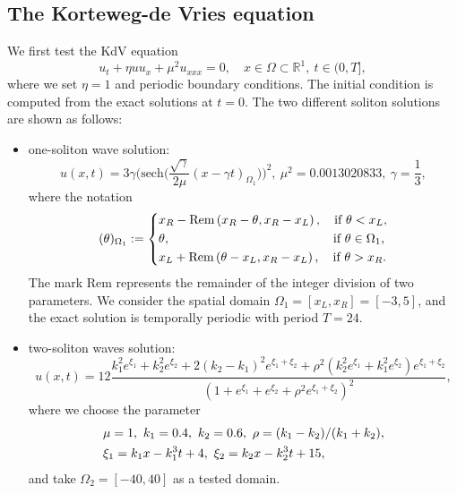 \documentclass[onefignum,onetabnum]{siamart}
\begin{document}
\subsection{The Korteweg-de Vries equation}
We first test the KdV equation
\begin{equation*}
	u_t+\eta uu_x+\mu^2 u_{xxx}=0,\quad x\in\Omega\subset\mathbb{R}^1,~t\in (0,T],
\end{equation*}
where we set $\eta=1$ and periodic boundary conditions. The initial condition is computed from the exact solutions at $t=0$. The two different soliton solutions \cite{luigi-19-HBVM-KDV-JCAM} are shown as follows:
\begin{itemize}
\item[{(1)}]one-soliton wave solution: 
\begin{equation*}
	u(x,t)=3\gamma\Big(\mbox{sech}\big(\frac{\sqrt{\gamma}}{2\mu}(x-\gamma t)_{\Omega_1}\big)\Big)^2,~\mu^2=0.0013020833,~\gamma=\frac{1}{3},
\end{equation*}
where the notation
\begin{equation*}
	(\theta)_{\Omega_1}:=
	\left\{\aligned
	&x_R-\mbox{Rem}\left(x_R-\theta,x_R-x_L\right),\quad \mbox{if}\ \theta<x_L,\\
	&\theta,\quad\quad\quad\quad\quad\quad\quad\quad\quad\quad\quad\quad\quad\mbox{if}\ \theta\in\Omega_1,\\
	&x_L+\mbox{Rem}\left(\theta-x_L,x_R-x_L\right),\quad\mbox{if}\ \theta>x_R.
	\endaligned\right.
\end{equation*}
The mark Rem represents the remainder of the integer division of two parameters. We consider the spatial domain $\Omega_1=[x_L,x_R]=[-3,5]$, and the exact solution is temporally periodic with period $T=24$.
\item[{(2)}]two-soliton waves solution: 
\begin{equation*}
	u(x,t)=12\frac{k_1^2e^{\xi_1}+k_2^2e^{\xi_2}+2(k_2-k_1)^2e^{\xi_1+\xi_2}+\rho^2(k_2^2e^{\xi_1}+k_1^2e^{\xi_2})e^{\xi_1+\xi_2}}{(1+e^{\xi_1}+e^{\xi_2}+\rho^2e^{\xi_1+\xi_2})^2},
\end{equation*}
where we choose the parameter 
\begin{align*}
	\aligned
	&\mu=1,~k_1=0.4,~k_2=0.6,~\rho=(k_1-k_2)/(k_1+k_2),\\
	&\xi_1=k_1x-k_1^3t+4,~\xi_2=k_2x-k_2^3t+15,
	\endaligned
\end{align*}
and take $\Omega_2=[-40,40]$ as a tested domain.
\end{itemize}
\end{document}
